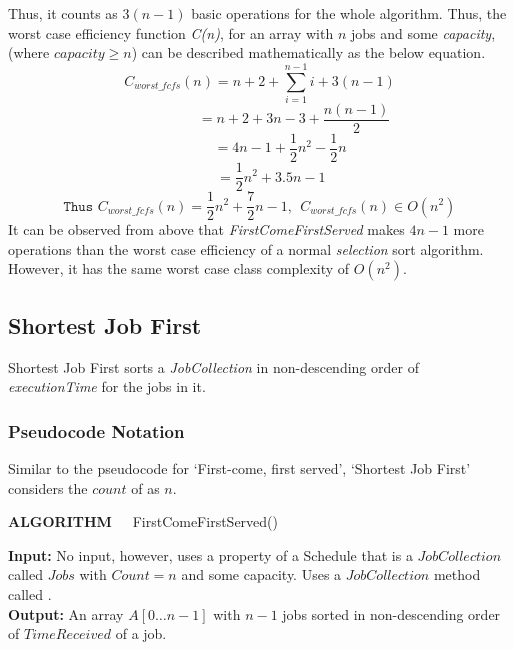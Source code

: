 \documentclass[a4paper]{article}
\begin{document}
Thus, it counts as $3(n-1)$ basic operations for the whole algorithm. Thus, the worst case efficiency function \textit{C(n)}, for an array with $n$ jobs and some \textit{capacity}, (where \textit{$capacity \geq n$}) can be described mathematically as the below equation.
\[
   C_{worst\_fcfs}(n)=n+2+
   \sum^{n-1}_{i=1}{i} + 3(n-1)
\]
\[  ~~~~~~~~~~~~~~~~~~~~~~
   = n + 2 + 3n - 3 + \frac{n(n-1)}{2}
\]
\[  ~~~~~~~~~~~~~
   = 4n - 1 + \frac{1}{2}n^2-\frac{1}{2}n
\]
\[  ~~~~~~~
   = \frac{1}{2}n^2 +3.5n - 1
\]
\[ 
   \texttt{Thus } C_{worst\_fcfs}(n)= \frac{1}{2}n^2+\frac{7}{2}n - 1, 
   ~~ C_{worst\_fcfs}(n) \in O(n^2)
\]
\noindent
It can be observed from above that \textit{FirstComeFirstServed} makes \(4n-1\) more operations than the worst case efficiency of a normal \textit{selection} sort algorithm. However, it has the same worst case class complexity of \(O(n^2)\). 
\pagebreak

\subsection{Shortest Job First}
Shortest Job First sorts a \textit{JobCollection} in non-descending order of \textit{executionTime} for the jobs in it.

\subsubsection{Pseudocode Notation}
Similar to the pseudocode for `First-come, first served', `Shortest Job First' considers the $count$ of  as $n$.
\vspace{-0.1cm}
\begin{algorithm}
   \caption*{\textbf{ALGORITHM~~}  FirstComeFirstServed{()}}
   \textbf{Input:} No input, however, uses a property of a Schedule that is a $JobCollection$ called $Jobs$ with $Count=n$ and some capacity. Uses a $JobCollection$ method called . \\
   \textbf{Output:} An array $A[0\ldots n-1]$ with $n-1$ jobs sorted in non-descending order of $TimeReceived$ of a job.

   \begin{algorithmic}[1]
            \EndIf{}
         \EndFor{}
      \EndFor{}

   \end{algorithmic}
\end{algorithm}
\vspace{-0.5cm}
\end{document}
